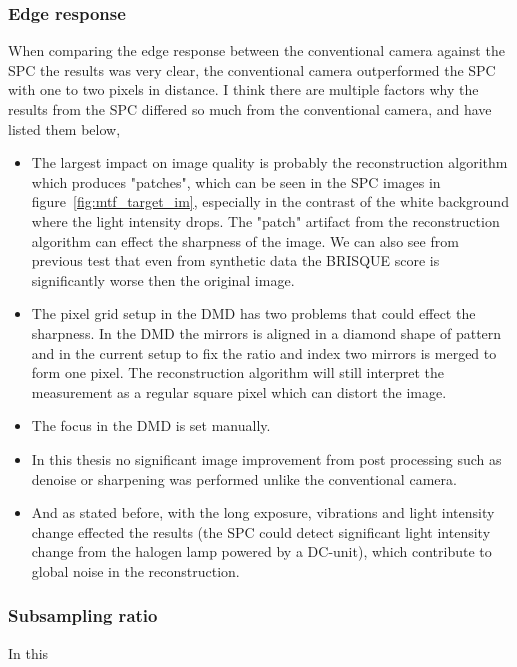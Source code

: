 \subsubsection{Edge response}
When comparing the edge response between the conventional camera against the SPC the results was very clear, the conventional camera outperformed the SPC with one to two pixels in distance. I think there are multiple factors why the results from the SPC differed so much from the conventional camera, and have listed them below,

\begin{itemize}
\item The largest impact on image quality is probably the reconstruction algorithm which produces "patches", which can be seen in the SPC images in figure~\ref{fig:mtf_target_im}, especially in the contrast of the white background where the light intensity drops. The "patch" artifact from the reconstruction algorithm can effect the sharpness of the image. We can also see from previous test that even from synthetic data the BRISQUE score is significantly worse then the original image.

\item The pixel grid setup in the DMD has two problems that could effect the sharpness. In the DMD the mirrors is aligned in a diamond shape of pattern and in the current setup to fix the ratio and index two mirrors is merged to form one pixel. The reconstruction algorithm will still interpret the measurement as a regular square pixel which can distort the image.

\item The focus in the DMD is set manually.

\item In this thesis no significant image improvement from post processing such as denoise or sharpening was performed unlike the conventional camera.

\item And as stated before, with the long exposure, vibrations and light intensity change effected the results (the SPC could detect significant light intensity change from the halogen lamp powered by a DC-unit), which contribute to global noise in the reconstruction.

\end{itemize}



\subsubsection{Subsampling ratio}
In this 


